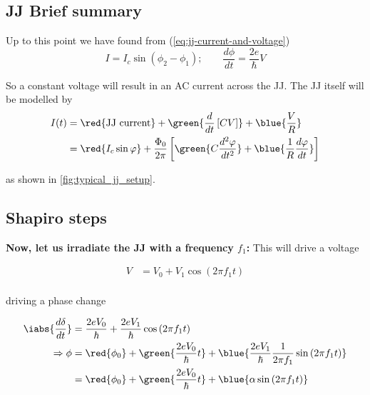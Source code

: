    \subsection{JJ Brief summary}
   \label{sec:jj-brief-summary}

\begin{framed}\noindent
  Up      to      this      point      we      have      found      from
  (\autoref{eq:jj-current-and-voltage})
  \begin{equation}
    I = I_c\sin(\phi_2-\phi_1); \qquad \frac{d\phi}{dt} = \frac{2e}{\hbar}V
  \end{equation}

  \noindent So  a constant voltage will  result in an AC  current across
  the JJ. The JJ itself will be modelled by
  \begin{equation}\label{eq:jj-total-current}
    \begin{aligned}
      I(t) & = \red{\text{JJ current}} + \green{\frac{d}{dt}\left[ CV \right]} + \blue{\frac{V}{R}}\\
      &  = \red{I_c\sin\varphi}  + \frac{\Phi_{0}}{2\pi}\left[  \green{C
          \frac{d^2\varphi}{dt^{2}}}                                   +
        \blue{\frac{1}{R}\frac{d\varphi}{dt}} \right]
    \end{aligned}
  \end{equation}

  \noindent as shown in \autoref{fig:typical_jj_setup}.
\end{framed}

\subsection{Shapiro steps}
\label{sec:shapiro-steps}

\textbf{Now, let us irradiate the JJ  with a frequency $f_1$:} This will
drive a voltage

\begin{equation}
  \begin{aligned}
    V & = V_0 + V_1\cos\left(2\pi f_1 t  \right)\\
  \end{aligned}
\end{equation}

\noindent driving a phase change

\begin{equation}
  \begin{aligned}
    \iabs{\frac{d\delta}{dt}} & = \frac{2eV_0}{\hbar} +
    \frac{2eV_{1}}{\hbar}\cos\left(  2\pi f_1  t \right)  \\
    \Rightarrow    \phi   &    =    \red{\phi_0}    +   \green{\frac{2eV_0}{\hbar}t}    +
    \blue{\frac{2eV_{1}}{\hbar}\frac{1}{2\pi
        f_{1}}\sin\left( 2\pi f_1 t \right)} \\
    & = \red{\phi_0} + \green{\frac{2eV_0}{\hbar}t} +
    \blue{\alpha\sin\left( 2\pi f_1 t \right)} \\
  \end{aligned}
\end{equation}

